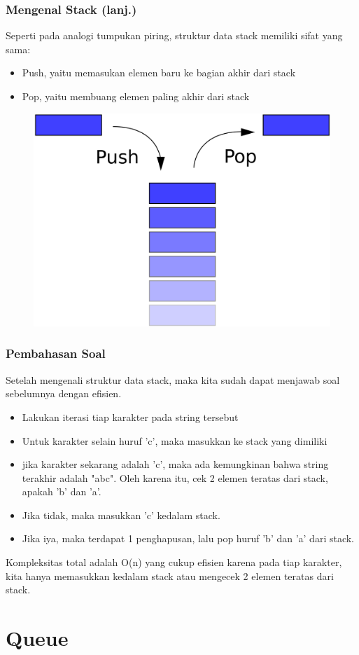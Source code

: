 \begin{frame}
\frametitle{Mengenal Stack (lanj.)}

Seperti pada analogi tumpukan piring, struktur data stack memiliki sifat yang sama:
\begin{itemize}
	\item Push, yaitu memasukan elemen baru ke bagian akhir dari stack
	\item Pop, yaitu membuang elemen paling akhir dari stack
\end{itemize}

\begin{figure}
	\centering
	\includegraphics[width=4 cm]{asset/stack.png}
\end{figure}
\end{frame}

\begin{frame}
\frametitle{Pembahasan Soal}

Setelah mengenali struktur data stack, maka kita sudah dapat menjawab soal sebelumnya dengan efisien.
\begin{itemize}
	\item Lakukan iterasi tiap karakter pada string tersebut
	\item Untuk karakter selain huruf 'c', maka masukkan ke stack yang dimiliki
	\item jika karakter sekarang adalah 'c', maka ada kemungkinan bahwa string terakhir adalah "abc". Oleh karena itu, cek 2 elemen teratas dari stack, apakah 'b' dan 'a'.
	\item Jika tidak, maka masukkan 'c' kedalam stack.
	\item Jika iya, maka terdapat 1 penghapusan, lalu pop huruf 'b' dan 'a' dari stack.
\end{itemize}
Kompleksitas total adalah O(n) yang cukup efisien karena pada tiap karakter, kita hanya memasukkan kedalam stack atau mengecek 2 elemen teratas dari stack.
\end{frame}

\section{Queue}
\frame{\sectionpage}

